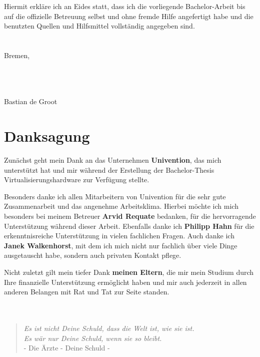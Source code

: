 \documentclass[parskip*,DIV12,BCOR10mm,headsepline,a4paper,12pt]{scrreprt}
\begin{document}
Hiermit erkläre ich an Eides statt, dass ich die vorliegende Bachelor-Arbeit bis auf die offizielle Betreuung selbst und ohne fremde Hilfe angefertigt habe und die benutzten Quellen und Hilfsmittel vollständig angegeben sind.
\\\\\\
Bremen, \date{\today}
\\\\\\
Bastian de Groot
\newpage
\chapter*{Danksagung}
Zunächst geht mein Dank an das Unternehmen \textbf{Univention}, das mich unterstützt hat und mir während der Erstellung der Bachelor-Thesis Virtualisierungshardware zur Verfügung stellte.

Besonders danke ich allen Mitarbeitern von Univention für die sehr gute Zusammenarbeit und das angenehme Arbeitsklima. Hierbei möchte ich mich besonders bei meinem Betreuer \textbf{Arvid Requate} bedanken, für die hervorragende Unterstützung während dieser Arbeit. Ebenfalls danke ich \textbf{Philipp Hahn} für die erkenntnisreiche Unterstützung in vielen fachlichen Fragen. Auch danke ich \textbf{Janek Walkenhorst}, mit dem ich mich nicht nur fachlich über viele Dinge ausgetauscht habe, sondern auch privaten Kontakt pflege.

Nicht zuletzt gilt mein tiefer Dank \textbf{meinen Eltern}, die mir mein Studium durch Ihre finanzielle Unterstützung ermöglicht haben und mir auch jederzeit in allen anderen Belangen mit Rat und Tat zur Seite standen.
\\\\\\
\begin{quote}\centering
\textit{Es ist nicht Deine Schuld, dass die Welt ist, wie sie ist.\\
Es wär nur Deine Schuld, wenn sie so bleibt.}\\
\fontsize{9pt}{10pt}\selectfont - Die Ärzte - Deine Schuld -
\end{quote}

\newpage
\tableofcontents






\appendix

\newpage





\listoffigures
\lstlistoflistings
\end{document}
